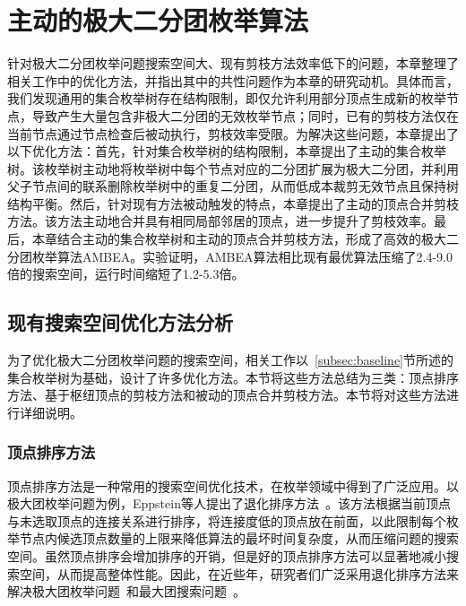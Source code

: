 \chapter{主动的极大二分团枚举算法}
\label{ch:aggressive_mbe}

针对极大二分团枚举问题搜索空间大、现有剪枝方法效率低下的问题，本章整理了相关工作中的优化方法，并指出其中的共性问题作为本章的研究动机。具体而言，我们发现通用的集合枚举树存在结构限制，即仅允许利用部分顶点生成新的枚举节点，导致产生大量包含非极大二分团的无效枚举节点；同时，已有的剪枝方法仅在当前节点通过节点检查后被动执行，剪枝效率受限。为解决这些问题，本章提出了以下优化方法：首先，针对集合枚举树的结构限制，本章提出了主动的集合枚举树。该枚举树主动地将枚举树中每个节点对应的二分团扩展为极大二分团，并利用父子节点间的联系删除枚举树中的重复二分团，从而低成本裁剪无效节点且保持树结构平衡。然后，针对现有方法被动触发的特点，本章提出了主动的顶点合并剪枝方法。该方法主动地合并具有相同局部邻居的顶点，进一步提升了剪枝效率。最后，本章结合主动的集合枚举树和主动的顶点合并剪枝方法，形成了高效的极大二分团枚举算法AMBEA。实验证明，AMBEA算法相比现有最优算法压缩了2.4-9.0倍的搜索空间，运行时间缩短了1.2-5.3倍。

\section{现有搜索空间优化方法分析}
\label{sec:opt}

为了优化极大二分团枚举问题的搜索空间，相关工作以~\ref{subsec:baseline}节所述的集合枚举树为基础，设计了许多优化方法。本节将这些方法总结为三类：顶点排序方法、基于枢纽顶点的剪枝方法和被动的顶点合并剪枝方法。本节将对这些方法进行详细说明。

\subsection{顶点排序方法}
\label{subsec:order}

顶点排序方法是一种常用的搜索空间优化技术，在枚举领域中得到了广泛应用。以极大团枚举问题为例，Eppstein等人提出了退化排序方法~\cite{MCEdegeneracy10}。该方法根据当前顶点与未选取顶点的连接关系进行排序，将连接度低的顶点放在前面，以此限制每个枚举节点内候选顶点数量的上限来降低算法的最坏时间复杂度，从而压缩问题的搜索空间。虽然顶点排序会增加排序的开销，但是好的顶点排序方法可以显著地减小搜索空间，从而提高整体性能。因此，在近些年，研究者们广泛采用退化排序方法来解决极大团枚举问题~\cite{MCEparallel20,MCE20,MCE22,MCE-GPU21,MCE-22}和最大团搜索问题~\cite{MEC20,MEC22}。





